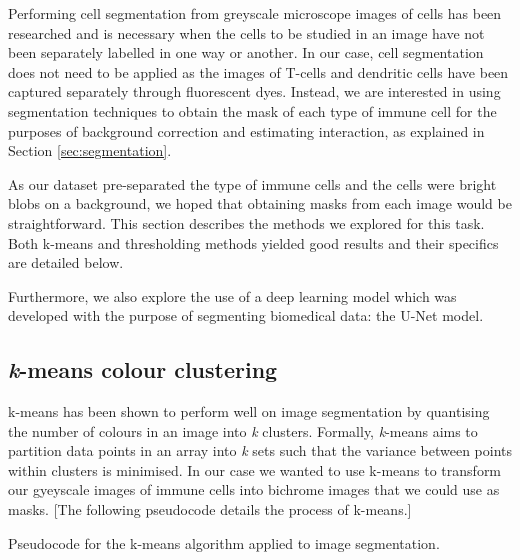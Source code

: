 Performing cell segmentation from greyscale microscope images of cells has been researched and is necessary when the cells to be studied in an image have not been separately labelled in one way or another. In our case, cell segmentation does not need to be applied as the images of T-cells and dendritic cells have been captured separately through fluorescent dyes. Instead, we are interested in using segmentation techniques to obtain the mask of each type of immune cell for the purposes of background correction and estimating interaction, as explained in Section \ref{sec:segmentation}.

As our dataset pre-separated the type of immune cells and the cells were bright blobs on a background, we hoped that obtaining masks from each image would be straightforward. This section describes the methods we explored for this task. Both k-means and thresholding methods yielded good results and their specifics are detailed below.

Furthermore, we also explore the use of a deep learning model which was developed with the purpose of segmenting biomedical data: the U-Net model.

\subsection{\textit{k}-means colour clustering}

k-means has been shown to perform well on image segmentation by quantising the number of colours in an image into \textit{k} clusters. Formally, \textit{k}-means aims to partition data points in an array into \textit{k} sets such that the variance between points within clusters is minimised. In our case we wanted to use k-means to transform our gyeyscale images of immune cells into bichrome images that we could use as masks. [The following pseudocode details the process of k-means.]

\begin{algorithm}[h]
    \DontPrintSemicolon

\caption{Pseudocode for the k-means algorithm applied to image segmentation.}
\label{alg:kmeans}
\end{algorithm}

